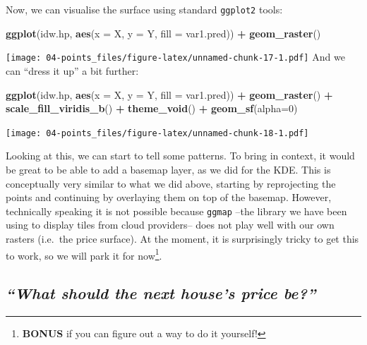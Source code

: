 \documentclass[
]{book}
\newenvironment{Shaded}{\begin{snugshade}}{\end{snugshade}}
\newcommand{\DataTypeTok}[1]{\textcolor[rgb]{0.13,0.29,0.53}{#1}}
\newcommand{\DecValTok}[1]{\textcolor[rgb]{0.00,0.00,0.81}{#1}}
\newcommand{\KeywordTok}[1]{\textcolor[rgb]{0.13,0.29,0.53}{\textbf{#1}}}
\newcommand{\NormalTok}[1]{#1}
\newcommand{\OperatorTok}[1]{\textcolor[rgb]{0.81,0.36,0.00}{\textbf{#1}}}
\newcommand{\StringTok}[1]{\textcolor[rgb]{0.31,0.60,0.02}{#1}}
\begin{document}
Now, we can visualise the surface using standard \texttt{ggplot2} tools:

\begin{Shaded}
\begin{Highlighting}[]
\KeywordTok{ggplot}\NormalTok{(idw.hp, }\KeywordTok{aes}\NormalTok{(}\DataTypeTok{x =}\NormalTok{ X, }\DataTypeTok{y =}\NormalTok{ Y, }\DataTypeTok{fill =}\NormalTok{ var1.pred)) }\OperatorTok{+}
\StringTok{  }\KeywordTok{geom_raster}\NormalTok{()}
\end{Highlighting}
\end{Shaded}

\texttt{[image: 04-points\_files/figure-latex/unnamed-chunk-17-1.pdf]}
And we can ``dress it up'' a bit further:

\begin{Shaded}
\begin{Highlighting}[]
\KeywordTok{ggplot}\NormalTok{(idw.hp, }\KeywordTok{aes}\NormalTok{(}\DataTypeTok{x =}\NormalTok{ X, }\DataTypeTok{y =}\NormalTok{ Y, }\DataTypeTok{fill =}\NormalTok{ var1.pred)) }\OperatorTok{+}
\StringTok{  }\KeywordTok{geom_raster}\NormalTok{() }\OperatorTok{+}
\StringTok{  }\KeywordTok{scale_fill_viridis_b}\NormalTok{() }\OperatorTok{+}
\StringTok{  }\KeywordTok{theme_void}\NormalTok{() }\OperatorTok{+}
\StringTok{  }\KeywordTok{geom_sf}\NormalTok{(}\DataTypeTok{alpha=}\DecValTok{0}\NormalTok{)}
\end{Highlighting}
\end{Shaded}

\texttt{[image: 04-points\_files/figure-latex/unnamed-chunk-18-1.pdf]}

Looking at this, we can start to tell some patterns. To bring in context, it would be great to be able to add a basemap layer, as we did for the KDE. This is conceptually very similar to what we did above, starting by reprojecting the points and continuing by overlaying them on top of the basemap. However, technically speaking it is not possible because \texttt{ggmap} --the library we have been using to display tiles from cloud providers-- does not play well with our own rasters (i.e.~the price surface). At the moment, it is surprisingly tricky to get this to work, so we will park it for now\footnote{\textbf{BONUS} if you can figure out a way to do it yourself!}.

\hypertarget{what-should-the-next-houses-price-be}{%
\subsection{\texorpdfstring{\emph{``What should the next house's price be?''}}{``What should the next house's price be?''}}\label{what-should-the-next-houses-price-be}}
\end{document}
